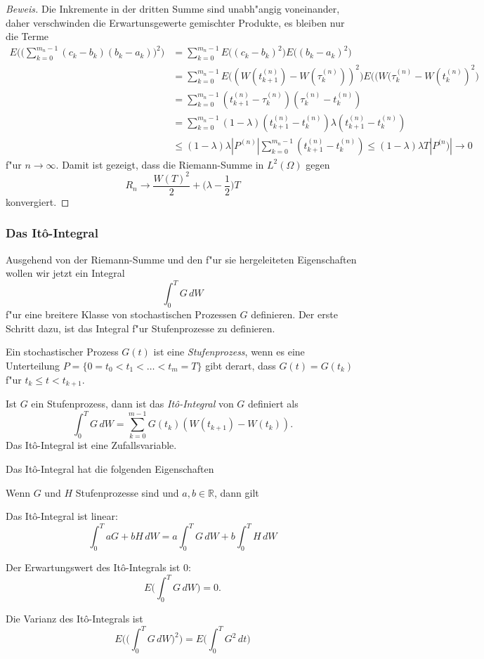 \begin{proof}[Beweis]
Die Inkremente in der dritten Summe sind unabh"angig voneinander, daher
verschwinden die Erwartunsgewerte gemischter Produkte, es bleiben nur
die Terme
\begin{align*}
E\biggl(\biggl(\sum_{k=0}^{m_n-1}(c_k-b_k)(b_k-a_k)\biggr)^2\biggr)
&=
\sum_{k=0}^{m_n-1}
E\bigl((c_k-b_k)^2\bigr)E\bigl((b_k-a_k)^2\bigr)
\\
&=
\sum_{k=0}^{m_n-1}
E\bigl((W(t_{k+1}^{(n)})-W(\tau_k^{(n)}))^2\bigr)E\bigl((W(\tau_k^{(n)}-W(t_k^{(n)})^2\bigr)
\\
&=
\sum_{k=0}^{m_n-1}
(t_{k+1}^{(n)}-\tau_k^{(n)}) (\tau_k^{(n)}-t_k^{(n)})
\\
&=
\sum_{k=0}^{m_n-1}
(1-\lambda)(t_{k+1}^{(n)}-t_k^{(n)}) \lambda(t_{k+1}^{(n)}-t_k^{(n)})
\\
&\le 
(1-\lambda)\lambda
|P^{(n)}|
\sum_{k=0}^{m_n-1}
(t_{k+1}^{(n)}-t_k^{(n)})
\le (1-\lambda)\lambda T|P^{(n})|\to 0
\end{align*}
f"ur $n\to\infty$.
Damit ist gezeigt, dass die Riemann-Summe in $L^2(\Omega)$ gegen
\[
R_n\to
\frac{W(T)^2}2+\biggl(\lambda-\frac12\biggr)T
\]
konvergiert.
\end{proof}

\subsubsection{Das It\^o-Integral}
Ausgehend von der Riemann-Summe und den f"ur sie hergeleiteten Eigenschaften
wollen wir jetzt ein Integral
\[
\int_0^T G\,dW
\]
f"ur eine breitere Klasse von stochastischen Prozessen $G$ definieren.
Der erste Schritt dazu, ist das Integral f"ur Stufenprozesse zu definieren.

\begin{definition}
Ein stochastischer Prozess $G(t)$ ist eine {\em Stufenprozess}, wenn es eine
Unterteilung $P=\{0=t_0<t_1<\dots<t_m=T\}$ gibt derart, dass
$G(t)=G(t_k)$ f"ur $t_k\le t<t_{k+1}$.
\end{definition}

\begin{definition}
Ist $G$ ein Stufenprozess, dann ist das {\em It\^o-Integral} von $G$ definiert
als
\[
\int_0^TG\,dW = \sum_{k=0}^{m-1}G(t_k)(W(t_{k+1})-W(t_k)).
\]
Das It\^o-Integral ist eine Zufallsvariable.
\end{definition}

Das It\^o-Integral hat die folgenden Eigenschaften
\begin{hilfssatz}
Wenn $G$ und $H$ Stufenprozesse sind und $a,b\in\mathbb R$, dann gilt
\begin{compactenum}
\item Das It\^o-Integral ist linear:
\[
\int_0^T aG+bH\,dW
=
a\int_0^T G\,dW + b \int_0^TH\,dW
\]
\item Der Erwartungswert des It\^o-Integrals ist $0$:
\[
E\biggl(\int_0^T G\,dW\biggr)=0.
\]
\item Die Varianz des It\^o-Integrals ist
\[
E\biggl(\biggl(\int_0^T G\,dW\biggr)^2\biggr)
=
E\biggl(\int_0^T G^2\,dt\biggr)
\]
\end{compactenum}
\end{hilfssatz}

